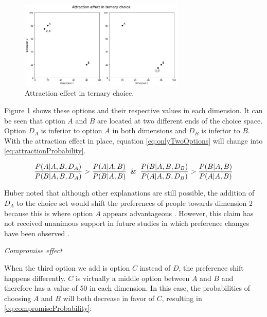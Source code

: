 \documentclass[a4paper,12pt]{article}
\begin{document}
\begin{figure}[h]
    \centering
    \includegraphics[width=0.7\textwidth]{staticFiles/attractionEffect.png}
    \caption{Attraction effect in ternary choice.} %
    \label{fig:attractionEffect} %

\end{figure}

Figure \ref{fig:attractionEffect} shows these options and their respective values in each dimension. It can be seen that option $A$ and $B$ are located at two different ends of the choice space. Option $D_A$ is inferior to option $A$ in both dimensions and $D_B$ is inferior to $B$. With the attraction effect in place, equation \ref{eq:onlyTwoOptions} will change into \ref{eq:attractionProbability}.

\begin{equation}\label{eq:attractionProbability}
    \frac{P(A|A,B,D_A)}{P(B|A,B,D_A)} > \frac{P(A|A,B)}{P(B|A,B)} \And \frac{P(B|A,B,D_B)}{P(A|A,B,D_B)} > \frac{P(B|A,B)}{P(A|A,B)}
\end{equation}

Huber noted that although other explanations are still possible, the addition of $D_A$ to the choice set would shift the preferences of people towards dimension 2 because this is where option $A$ appears advantageous \cite{huberEtAl82, bhatia2013associations}. However, this claim has not received unanimous support in future studies in which preference changes have been observed \citep{wedell1991distinguishing}.

\textit{Compromise effect}

When the third option we add is option $C$ instead of $D$, the preference shift happens differently. $C$ is virtually a middle option between $A$ and $B$ and therefore has a value of 50 in each dimension. In this case, the probabilities of choosing $A$ and $B$ will both decrease in favor of $C$, resulting in \ref{eq:compromiseProbability}:
\end{document}
